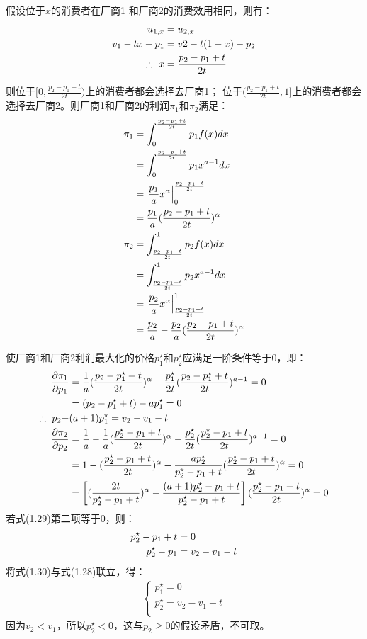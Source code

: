 \qsubpart 
假设位于$x$的消费者在厂商1 和厂商2的消费效用相同，则有：
\begin{align}
     u_{1,x}&=u_{2,x} \notag \\ 
     v_1-tx-p_1 &= v2-t(1-x)-p_2 \notag \\
     \therefore \  x &= \frac{p_2-p_1+t}{2t}
\end{align}

则位于$[0,\frac{p_2-p_1+t}{2t})$上的消费者都会选择去厂商1； 位于$(\frac{p_2-p_1+t}{2t},1]$上的消费者都会选择去厂商2。则厂商1和厂商2的利润$\pi_1$和$\pi_2$满足：
\begin{align}
    \pi_1 &=\int_0^{\frac{p_2-p_1+t}{2t}} p_1f(x)dx   \notag \\
    &=\int_0^{\frac{p_2-p_1+t}{2t}} p_1 x^{a-1}dx \notag \\
    &=\left.\frac{p_1}{a}x^{\alpha} \right|_0^{\frac{p_2-p_1+t}{2t}} \notag \\
    &=\frac{p_1}{a}(\frac{p_2-p_1+t}{2t})^{\alpha}\\
    \pi_2 &=\int_{\frac{p_2-p_1+t}{2t}}^1 p_2f(x)dx  \notag \\
    &=\int_{\frac{p_2-p_1+t}{2t}}^1 p_2 x^{a-1}dx \notag \\
    &=\left.\frac{p_2}{a}x^{\alpha} \right|_{\frac{p_2-p_1+t}{2t}}^1 \notag \\
    &=\frac{p_2}{a} -\frac{p_2}{a}(\frac{p_2-p_1+t}{2t})^{\alpha} 
\end{align}

使厂商1和厂商2利润最大化的价格$p_1^{\star}$和$p_2^{\star}$应满足一阶条件等于0，即：
\begin{align}
    \frac{\partial \pi_1 }{\partial p_1} &=\frac{1}{a}(\frac{p_2-p_1^{\star}+t}{2t})^{\alpha} -\frac{p_1^{\star}}{2t}(\frac{p_2-p_1^{\star}+t}{2t})^{a-1} =0\notag \\
    &=(p_2-p_1^{\star}+t)-ap_1^{\star} =0 \notag \\
    \therefore \ p_2- &(a+1)p_1^{\star}= v_2-v_1-t \\
    \frac{\partial \pi_2 }{\partial p_2} &=\frac{1}{a}-\frac{1}{a}(\frac{p_2^{\star}-p_1+t}{2t})^{\alpha} -\frac{p_2^{\star}}{2t}(\frac{p_2^{\star}-p_1+t}{2t})^{a-1} =0 \notag \\
    &=1-(\frac{p_2^{\star}-p_1+t}{2t})^{\alpha}-\frac{ap_2^{\star}}{p_2^{\star}-p_1+t}(\frac{p_2^{\star}-p_1+t}{2t})^{\alpha}=0 \notag \\
    &=\left[(\frac{2t}{p_2^{\star}-p_1+t})^{\alpha}-\frac{(a+1)p_2^{\star}-p_1+t}{p_2^{\star}-p_1+t}\right](\frac{p_2^{\star}-p_1+t}{2t})^{\alpha}=0 
\end{align}
若式(1.29)第二项等于0，则：
\begin{align}
    p_2^{\star}-p_1+t &= 0 \notag \\
    p_2^{\star}-p_1&=v_2-v_1-t 
\end{align}
将式(1.30)与式(1.28)联立，得：
\begin{align}
    \begin{cases}
     p_1^{\star} = 0 \\
     p_2^{\star} = v_2-v_1-t  \\
    \end{cases}
\end{align}
因为$v_2<v_1$，所以$p_2^{\star}<0$，这与$p_2\geq0$的假设矛盾，不可取。

